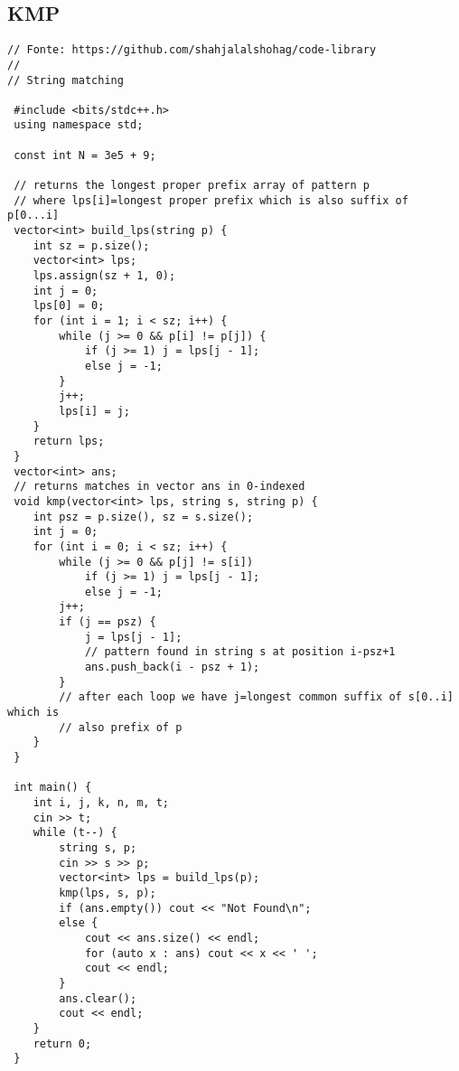 \documentclass[11pt, a4paper, twoside]{article}
\begin{document}
\subsection{KMP}
\begin{lstlisting}
// Fonte: https://github.com/shahjalalshohag/code-library
//
// String matching

 #include <bits/stdc++.h>
 using namespace std;
 
 const int N = 3e5 + 9;
 
 // returns the longest proper prefix array of pattern p
 // where lps[i]=longest proper prefix which is also suffix of p[0...i]
 vector<int> build_lps(string p) {
 	int sz = p.size();
 	vector<int> lps;
 	lps.assign(sz + 1, 0);
 	int j = 0;
 	lps[0] = 0;
 	for (int i = 1; i < sz; i++) {
 		while (j >= 0 && p[i] != p[j]) {
 			if (j >= 1) j = lps[j - 1];
 			else j = -1;
 		}
 		j++;
 		lps[i] = j;
 	}
 	return lps;
 }
 vector<int> ans;
 // returns matches in vector ans in 0-indexed
 void kmp(vector<int> lps, string s, string p) {
 	int psz = p.size(), sz = s.size();
 	int j = 0;
 	for (int i = 0; i < sz; i++) {
 		while (j >= 0 && p[j] != s[i])
 			if (j >= 1) j = lps[j - 1];
 			else j = -1;
 		j++;
 		if (j == psz) {
 			j = lps[j - 1];
 			// pattern found in string s at position i-psz+1
 			ans.push_back(i - psz + 1);
 		}
 		// after each loop we have j=longest common suffix of s[0..i] which is
 		// also prefix of p
 	}
 }
 
 int main() {
 	int i, j, k, n, m, t;
 	cin >> t;
 	while (t--) {
 		string s, p;
 		cin >> s >> p;
 		vector<int> lps = build_lps(p);
 		kmp(lps, s, p);
 		if (ans.empty()) cout << "Not Found\n";
 		else {
 			cout << ans.size() << endl;
 			for (auto x : ans) cout << x << ' ';
 			cout << endl;
 		}
 		ans.clear();
 		cout << endl;
 	}
 	return 0;
 }
\end{lstlisting}
\end{document}
